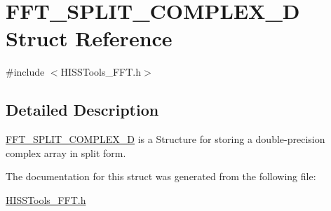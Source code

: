 \hypertarget{struct_f_f_t___s_p_l_i_t___c_o_m_p_l_e_x___d}{}\section{F\+F\+T\+\_\+\+S\+P\+L\+I\+T\+\_\+\+C\+O\+M\+P\+L\+E\+X\+\_\+D Struct Reference}
\label{struct_f_f_t___s_p_l_i_t___c_o_m_p_l_e_x___d}


{\ttfamily \#include $<$H\+I\+S\+S\+Tools\+\_\+\+F\+F\+T.\+h$>$}



\subsection{Detailed Description}
\hyperlink{struct_f_f_t___s_p_l_i_t___c_o_m_p_l_e_x___d}{F\+F\+T\+\_\+\+S\+P\+L\+I\+T\+\_\+\+C\+O\+M\+P\+L\+E\+X\+\_\+D} is a Structure for storing a double-\/precision complex array in split form. 

The documentation for this struct was generated from the following file\+:\begin{DoxyCompactItemize}
\item 
\hyperlink{_h_i_s_s_tools___f_f_t_8h}{H\+I\+S\+S\+Tools\+\_\+\+F\+F\+T.\+h}\end{DoxyCompactItemize}
